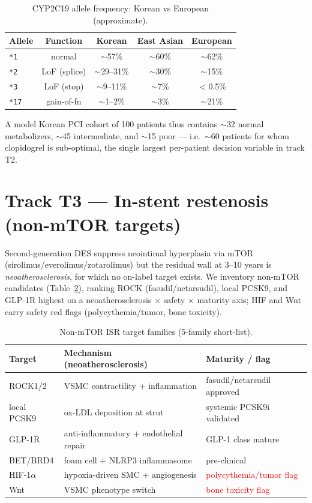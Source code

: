 \documentclass[11pt]{article}
\begin{document}
\begin{table}[h]
\centering
\caption{CYP2C19 allele frequency: Korean vs European (approximate).}
\label{tab:cyp}
\begin{tabular}{lcccc}
\toprule
Allele & Function & Korean & East Asian & European \\
\midrule
\texttt{*1}  & normal & $\sim$57\% & $\sim$60\% & $\sim$62\% \\
\texttt{*2}  & LoF (splice)   & $\sim$29--31\% & $\sim$30\% & $\sim$15\% \\
\texttt{*3}  & LoF (stop)     & $\sim$9--11\%  & $\sim$7\%  & $<$0.5\% \\
\texttt{*17} & gain-of-fn     & $\sim$1--2\%   & $\sim$3\%  & $\sim$21\% \\
\bottomrule
\end{tabular}
\end{table}

\noindent A model Korean PCI cohort of 100 patients thus contains $\sim$32 normal metabolizers, $\sim$45 intermediate, and $\sim$15 poor --- i.e.\ $\sim$60 patients for whom clopidogrel is sub-optimal, the single largest per-patient decision variable in track T2.

\section{Track T3 --- In-stent restenosis (non-mTOR targets)}
\label{sec:isr}

Second-generation DES suppress neointimal hyperplasia via mTOR (sirolimus/everolimus/zotarolimus) but the residual wall at 3--10 years is \emph{neoatherosclerosis}, for which no on-label target exists. We inventory non-mTOR candidates (Table~\ref{tab:isr}), ranking ROCK (fasudil/netarsudil), local PCSK9, and GLP-1R highest on a neoatherosclerosis $\times$ safety $\times$ maturity axis; HIF and Wnt carry safety red flags (polycythemia/tumor, bone toxicity).

\begin{table}[h]
\centering
\caption{Non-mTOR ISR target families (5-family short-list).}
\label{tab:isr}
\begin{tabular}{lll}
\toprule
Target & Mechanism (neoatherosclerosis) & Maturity / flag \\
\midrule
ROCK1/2     & VSMC contractility + inflammation & fasudil/netarsudil approved \\
local PCSK9 & ox-LDL deposition at strut         & systemic PCSK9i validated \\
GLP-1R      & anti-inflammatory + endothelial repair & GLP-1 class mature \\
BET/BRD4    & foam cell + NLRP3 inflammasome    & pre-clinical \\
HIF-1$\alpha$ & hypoxia-driven SMC + angiogenesis & \textcolor{red}{polycythemia/tumor flag} \\
Wnt         & VSMC phenotype switch             & \textcolor{red}{bone toxicity flag} \\
\bottomrule
\end{tabular}
\end{table}
\end{document}
